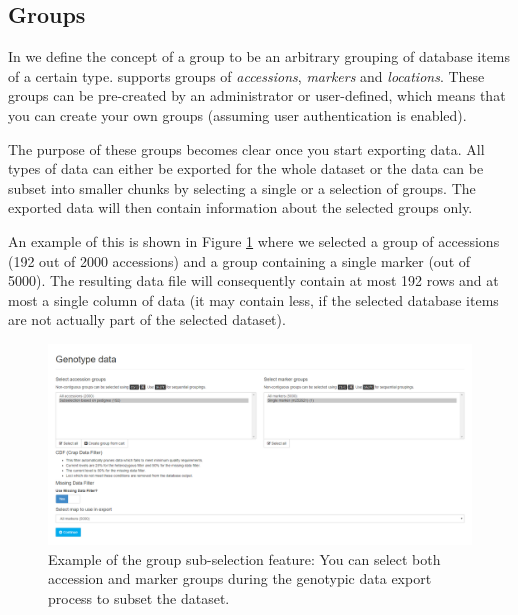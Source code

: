 \subsection{Groups}
In {\germinate} we define the concept of a group to be an arbitrary grouping of database items of a certain type. {\germinate} supports groups of \textit{accessions}, \textit{markers} and \textit{locations}. These groups can be pre-created by an administrator or user-defined, which means that you can create your own groups (assuming user authentication is enabled).

The purpose of these groups becomes clear once you start exporting data. All types of data can either be exported for the whole dataset or the data can be subset into smaller chunks by selecting a single or a selection of groups. The exported data will then contain information about the selected groups only.

An example of this is shown in Figure \ref{fig:features:group-subselection} where we selected a group of accessions (192 out of 2000 accessions) and a group containing a single marker (out of 5000). The resulting data file will consequently contain at most 192 rows and at most a single column of data (it may contain less, if the selected database items are not actually part of the selected dataset).

\begin{figure}
	\centering
	\includegraphics[width=0.85\linewidth]{img/features/group-subselection.png}
	\caption{Example of the group sub-selection feature: You can select both accession and marker groups during the genotypic data export process to subset the dataset.}
	\label{fig:features:group-subselection}
\end{figure}

